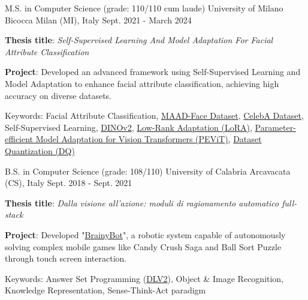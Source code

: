 

\begin{cventries}

\cventry
    {M.S. in Computer Science (grade: 110/110 cum laude)} %
    {University of Milano Bicocca} %
    {Milan (MI), Italy} %
    {Sept. 2021 - March 2024} %
    {
      \begin{cvitems} %
        \item \textbf{Thesis title}: \textit{Self-Supervised Learning And Model Adaptation For Facial Attribute Classification}
        \item \textbf{Project}: Developed an advanced framework using Self-Supervised Learning and Model Adaptation to enhance facial attribute classification, achieving high accuracy on diverse datasets.
        \item Keywords: Facial Attribute Classification, \href{https://arxiv.org/abs/2012.01030}{MAAD-Face Dataset}, \href{https://arxiv.org/abs/1411.7766}{CelebA Dataset}, Self-Supervised Learning, \href{https://arxiv.org/abs/2304.07193}{DINOv2}, \href{https://arxiv.org/abs/2106.09685}{Low-Rank Adaptation (LoRA)}, \href{https://arxiv.org/abs/2203.16329}{Parameter-efficient Model Adaptation for Vision Transformers (PEViT)}, \href{https://arxiv.org/abs/2308.10524}{Dataset Quantization (DQ)}
      \end{cvitems}
    }
    
\cventry
    {B.S. in Computer Science (grade: 108/110)} %
    {University of Calabria} %
    {Arcavacata (CS), Italy} %
    {Sept. 2018 - Sept. 2021} %
    {
      \begin{cvitems} %
        \item \textbf{Thesis title}: \textit{Dalla visione all'azione: moduli di ragionamento automatico full-stack}
        \item \textbf{Project}: Developed "\href{https://github.com/DeMaCS-UNICAL/BrainyBot}{BrainyBot}", a robotic system capable of autonomously solving complex mobile games like Candy Crush Saga and Ball Sort Puzzle through touch screen interaction.
        \item Keywords: Answer Set Programming (\href{https://dlv.demacs.unical.it/home}{DLV2}), Object \& Image Recognition, Knowledge Representation, Sense-Think-Act paradigm
      \end{cvitems}
    }
    


\end{cventries}
